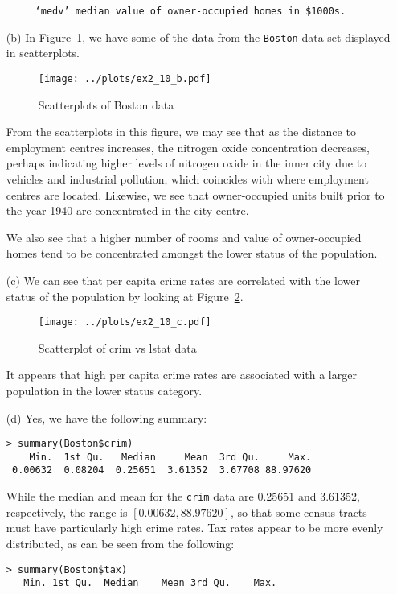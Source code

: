 \begin{itemize}
\begin{verbatim}
     ‘medv’ median value of owner-occupied homes in $1000s.
    \end{verbatim}\normalsize
\item[(b)] In Figure~\ref{fig7}, we have some of the data from the \verb|Boston| data
    set displayed in scatterplots.\par
    \begin{figure}[!ht]
        \texttt{[image: ../plots/ex2\_10\_b.pdf]}
        \caption{Scatterplots of Boston data \label{fig7}}
    \end{figure}
    \qquad From the scatterplots in this figure, we may see that as the distance to 
    employment centres increases, the nitrogen oxide concentration decreases,
    perhaps indicating higher levels of nitrogen oxide in the inner city due
    to vehicles and industrial pollution, which coincides with where employment
    centres are located. Likewise, we see that owner-occupied units built prior
    to the year 1940 are concentrated in the city centre.\par
    \qquad We also see that a higher number of rooms and value of owner-occupied 
    homes tend to be concentrated amongst the lower status of the population.
    \item[(c)] We can see that per capita crime rates are correlated with the
    lower status of the population by looking at Figure~\ref{fig8}.
    \begin{figure}[!ht]
        \texttt{[image: ../plots/ex2\_10\_c.pdf]}
        \caption{Scatterplot of crim vs lstat data \label{fig8}}
    \end{figure}
    It appears that high per capita crime rates are associated with a 
    larger population in the lower status category.
    \item[(d)] Yes, we have the following summary:
    \scriptsize\begin{verbatim}
> summary(Boston$crim)
    Min.  1st Qu.   Median     Mean  3rd Qu.     Max.
 0.00632  0.08204  0.25651  3.61352  3.67708 88.97620
    \end{verbatim}\normalsize
    While the median and mean for the \verb|crim| data are 
    0.25651 and 3.61352, respectively, the range is $[0.00632, 88.97620]$,
    so that some census tracts must have particularly high crime rates.
    Tax rates appear to be more evenly distributed, as can be seen from the
    following:
    \scriptsize\begin{verbatim}
> summary(Boston$tax)
   Min. 1st Qu.  Median    Mean 3rd Qu.    Max.

\end{verbatim}
\end{itemize}
